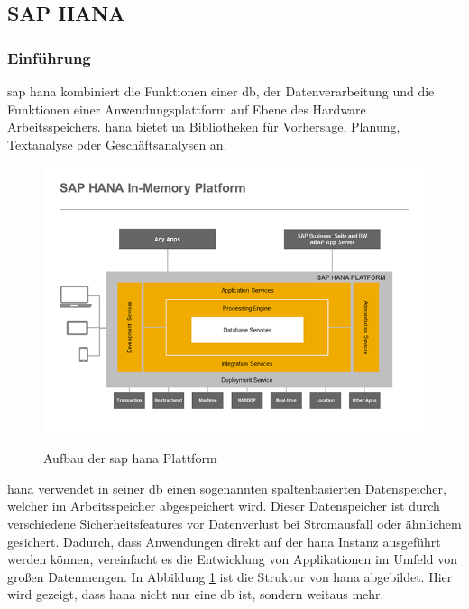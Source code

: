 \subsection{SAP HANA}
\label{sec:db-hana}

\subsubsection{Einführung}
\label{sec:db-hana-intro}
\gls{sap} \gls{hana} kombiniert die Funktionen einer \gls{db}, der Datenverarbeitung und die Funktionen einer Anwendungsplattform auf Ebene des Hardware Arbeitsspeichers. \gls{hana} bietet \gls{ua} Bibliotheken für Vorhersage, Planung, Textanalyse oder Geschäftsanalysen an.\\

\begin{figure}[H]
	\begin{center}
	\includegraphics[width=1\linewidth]{grafiken/hana-features-overview.png}
	\vspace{-20pt}
	\caption{Aufbau der \gls{sap} \gls{hana} Plattform \cite{SAPHanaAbout}}
	\vspace{-10pt}
	\label{abb:SAPHanaAbout}
	\end{center}
\end{figure}

\gls{hana} verwendet in seiner \gls{db} einen sogenannten spaltenbasierten Datenspeicher, welcher im Arbeitsspeicher abgespeichert wird. Dieser Datenspeicher ist durch verschiedene Sicherheitsfeatures vor Datenverlust bei Stromausfall oder ähnlichem gesichert.
Dadurch, dass Anwendungen direkt auf der \gls{hana} Instanz ausgeführt werden können, vereinfacht es die Entwicklung von Applikationen im Umfeld von großen Datenmengen. In Abbildung \ref{abb:SAPHanaAbout} ist die Struktur von \gls{hana} abgebildet. Hier wird gezeigt, dass \gls{hana} nicht nur eine \gls{db} ist, sondern weitaus mehr.

